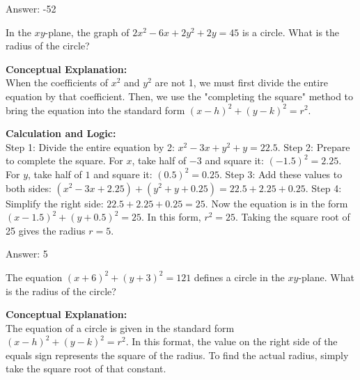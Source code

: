 \documentclass[11pt,paper=a4,answers]{exam}
\begin{document}
\begin{questions}
\begin{solution}
\vspace{30pt}

Answer: \colorbox{yellow!100}{-52}
\end{solution}

\vspace{60pt}

\question
In the $xy$-plane, the graph of $2x^2 - 6x + 2y^2 + 2y = 45$ is a circle. What is the radius of the circle?

\begin{solution}
\textbf{Conceptual Explanation:} \\
When the coefficients of $x^2$ and $y^2$ are not 1, we must first divide the entire equation by that coefficient. Then, we use the "completing the square" method to bring the equation into the standard form $(x - h)^2 + (y - k)^2 = r^2$.

\vspace{30pt}

\textbf{Calculation and Logic:} \\
Step 1: Divide the entire equation by 2: $x^2 - 3x + y^2 + y = 22.5$. Step 2: Prepare to complete the square. For $x$, take half of $-3$ and square it: $(-1.5)^2 = 2.25$. For $y$, take half of $1$ and square it: $(0.5)^2 = 0.25$. Step 3: Add these values to both sides: $(x^2 - 3x + 2.25) + (y^2 + y + 0.25) = 22.5 + 2.25 + 0.25$. Step 4: Simplify the right side: $22.5 + 2.25 + 0.25 = 25$. Now the equation is in the form $(x - 1.5)^2 + (y + 0.5)^2 = 25$. In this form, $r^2 = 25$. Taking the square root of 25 gives the radius $r = 5$.

\vspace{30pt}

Answer: \colorbox{yellow!100}{5}
\end{solution}

\vspace{60pt}

\question
The equation $(x + 6)^2 + (y + 3)^2 = 121$ defines a circle in the $xy$-plane. What is the radius of the circle?

\begin{solution}
\textbf{Conceptual Explanation:} \\
The equation of a circle is given in the standard form $(x - h)^2 + (y - k)^2 = r^2$. In this format, the value on the right side of the equals sign represents the square of the radius. To find the actual radius, simply take the square root of that constant.


\end{solution}
\end{questions}
\end{document}

